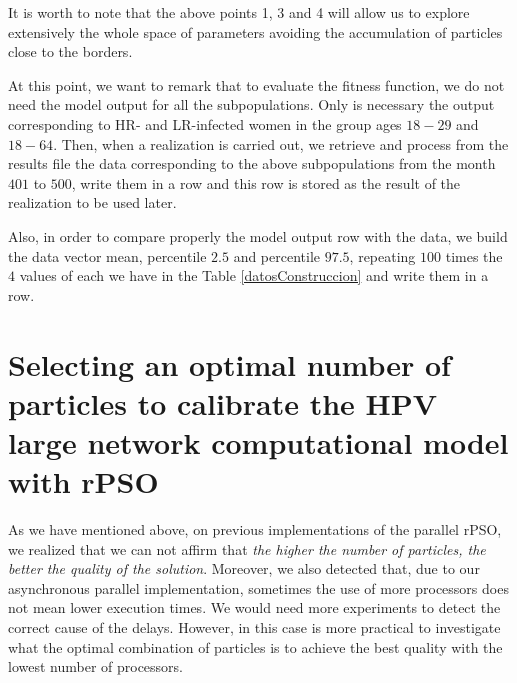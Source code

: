 It is worth to note that the above points 1, 3 and 4 will allow us to explore extensively the whole space of parameters avoiding the accumulation of particles close to the borders. 

\begin{remark}\label{mo}
At this point, we want to remark that to evaluate the fitness function, we do not need the model output for all the subpopulations. Only is necessary the output corresponding to HR- and LR-infected women in the group ages $18-29$ and $18-64$. Then, when a realization is carried out, we retrieve and process from the results file the data corresponding to the above subpopulations from the month $401$ to $500$, write them in a row and this row is stored as the result of the realization to be used later. 

Also, in order to compare properly the model output row with the data, we build the data vector mean, percentile $2.5$ and percentile $97.5$, repeating $100$ times the $4$ values of each we have in the Table \ref{datosConstruccion} and write them in a row.
\end{remark}

\section{Selecting an optimal number of particles to calibrate the HPV large network computational model with rPSO}
As we have mentioned above, on previous implementations of the parallel rPSO, we realized that we can not affirm that \textit{the higher the number of particles, the better the quality of the solution}. Moreover, we also detected that, due to our asynchronous parallel implementation, sometimes the use of more processors does not mean lower execution times. We would need more experiments to detect the correct cause of the delays. However, in this case is more practical to investigate what the optimal combination of particles is to achieve the best quality with the lowest number of processors.

